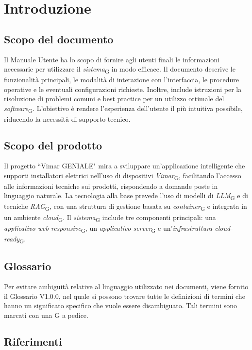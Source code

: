 \section{Introduzione}
\subsection{Scopo del documento}
Il Manuale Utente ha lo scopo di fornire agli utenti finali le informazioni necessarie per utilizzare il \textit{sistema}\textsubscript{G} in modo efficace. Il documento descrive le funzionalità principali, le modalità di interazione con l’interfaccia, le procedure operative e le eventuali configurazioni richieste. Inoltre, include istruzioni per la risoluzione di problemi comuni e best practice per un utilizzo ottimale del \textit{software}\textsubscript{G}. L'obiettivo è rendere l’esperienza dell’utente il più intuitiva possibile, riducendo la necessità di supporto tecnico.

\subsection{Scopo del prodotto}
Il progetto ``Vimar GENIALE" mira a sviluppare un'applicazione intelligente che supporti installatori elettrici nell'uso di dispositivi \textit{Vimar}\textsubscript{G}, facilitando l'accesso alle informazioni tecniche sui prodotti, rispondendo a domande poste in linguaggio naturale.
La tecnologia alla base prevede l'uso di modelli di \textit{LLM}\textsubscript{G} e di tecniche \textit{RAG}\textsubscript{G}, con una struttura di gestione basata su \textit{container}\textsubscript{G} e integrata in un ambiente \textit{cloud}\textsubscript{G}.
Il \textit{sistema}\textsubscript{G} include tre componenti principali: una \textit{applicativo web responsive}\textsubscript{G}, un \textit{applicativo server}\textsubscript{G} e un'\textit{infrastruttura cloud-ready}\textsubscript{G}. 

\subsection{Glossario}
Per evitare ambiguità relative al linguaggio utilizzato nei documenti, viene fornito il Glossario V1.0.0, nel quale si possono trovare tutte le definizioni di termini che hanno un significato specifico che vuole essere disambiguato. Tali termini sono marcati con una G a pedice. 

\subsection{Riferimenti}
